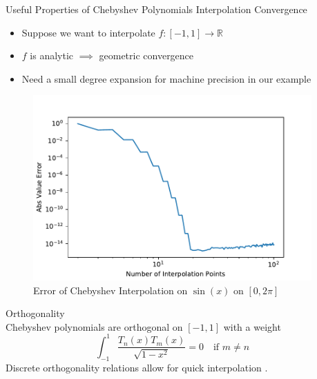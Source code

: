 \documentclass[final]{beamer}
\begin{document}
\begin{frame}[fragile]{}
\begin{columns}[t]
\begin{column}{.31\linewidth}
\end{column}

    \begin{column}{.31\linewidth}

%

\begin{block}{Useful Properties of Chebyshev Polynomials}
{\color{numhypRed} Interpolation Convergence \cite[Ch.\ 8]{trefethen_2012}}\\    %
\begin{minipage}{.4\textwidth}
\begin{itemize}
\item Suppose we want to interpolate $f:[-1,1]\to \mathbb{R}$
\item $f$ is analytic $\implies$ geometric convergence 
\item Need a small degree expansion for machine precision in our example
\end{itemize}
\end{minipage}
\begin{minipage}{.55\textwidth}
\begin{figure}
\includegraphics[width=\textwidth]{sine_error.pdf}
\caption{Error of Chebyshev Interpolation on $\sin(x)$ on $[0,2\pi]$}
\end{figure}
\end{minipage}
{\color{numhypRed} Orthogonality}\\
Chebyshev polynomials are orthogonal on $[-1,1]$ with a weight
$$\int_{-1}^{1}\frac{T_n(x)T_m(x)}{\sqrt{1-x^2}} = 0 \quad \text{if $m\neq n$}$$
Discrete orthogonality relations allow for quick interpolation \cite[Sec.\ 6.3]{mason_2003}.
\end{block}


\end{column}
\end{columns}
\end{frame}
\end{document}
